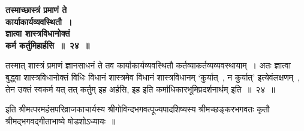  \begin{center}{\bfseries तस्माच्छास्त्रं प्रमाणं ते\\ कार्याकार्यव्यवस्थितौ~।\\ज्ञात्वा शास्त्रविधानोक्तं\\ कर्म कर्तुमिहार्हसि~॥~२४~॥}\end{center} 
तस्मात् शास्त्रं प्रमाणं ज्ञानसाधनं ते तव कार्याकार्यव्यवस्थितौ कर्तव्याकर्तव्यव्यवस्थायाम्~। अतः ज्ञात्वा बुद्ध्वा शास्त्रविधानोक्तं विधिः विधानं शास्त्रमेव विधानं शास्त्रविधानम् ‘कुर्यात्~, न कुर्यात्’ इत्येवंलक्षणम्~, तेन उक्तं स्वकर्म यत् तत् कर्तुम् इह अर्हसि, इह इति कर्माधिकारभूमिप्रदर्शनार्थम् इति~॥~२४~॥\par
 
इति श्रीमत्परमहंसपरिव्राजकाचार्यस्य श्रीगोविन्दभगवत्पूज्यपादशिष्यस्य श्रीमच्छङ्करभगवतः कृतौ श्रीमद्भगवद्गीताभाष्ये षोडशोऽध्यायः~॥\par
 
